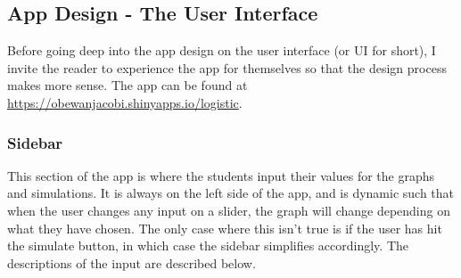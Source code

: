 \documentclass{article}\usepackage[]{graphicx}\usepackage[]{color}
\begin{document}
\subsection{App Design - The User Interface}

Before going deep into the app design on the user interface (or UI for short), I invite the reader to experience the app for themselves so that the design process makes more sense. The app can be found at \url{https://obewanjacobi.shinyapps.io/logistic}. 

\subsubsection{Sidebar}

This section of the app is where the students input their values for the graphs and simulations. It is always on the left side of the app, and is dynamic such that when the user changes any input on a slider, the graph will change depending on what they have chosen. The only case where this isn't true is if the user has hit the simulate button, in which case the sidebar simplifies accordingly. The descriptions of the input are described below.
\end{document}
